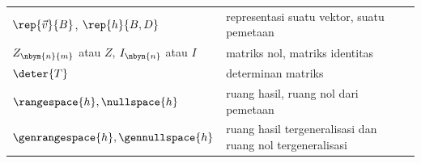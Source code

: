 \begin{center}
{\begin{tabular}{@{}>{\raggedleft\arraybackslash}p{}|>{\raggedright\arraybackslash}p{}@{}}
    \( \rep{\vec{v}}{B} \), \( \rep{h}{B,D} \)     
                          &representasi suatu vektor, suatu pemetaan    \\
    \( Z_{\nbym{n}{m}} \) atau \( Z \), \(I_{\nbyn{n}}\) atau \( I \)  &matriks nol, matriks identitas    \\
    \( \deter{T} \)        &determinan matriks       \\
    \( \rangespace{h},\nullspace{h} \)
                           &ruang hasil, ruang nol dari pemetaan  \\
    \( \genrangespace{h},\gennullspace{h} \)
                           &ruang hasil tergeneralisasi dan ruang nol tergeneralisasi
  \end{tabular}
  }
\end{center}
\vspace*{\fill}
\clearpage
\thispagestyle{empty}
\vspace*{\fill}
